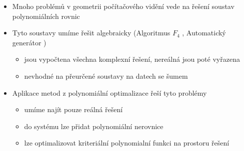 \documentclass[cmpiitalkstyle, 22pt]{cmptalk}
\begin{document}
\begin{cmptalkslide}[Motivace]
  \begin{itemize}
    \item Mnoho problémů v geometrii počítačového vidění vede na řešení soustav polynomiálních rovnic
    \item Tyto soustavy umíme řešit algebraicky (Algoritmus $F_4$ \cite{F4}, Automatický generátor \cite{AutoGen})
    \begin{itemize}
      \item jsou vypočtena všechna komplexní řešení, nereálná jsou poté vyřazena
      \item nevhodné na přeurčené soustavy na datech se šumem
    \end{itemize}
    \item Aplikace metod z polynomiální optimalizace řeší tyto problémy
    \begin{itemize}
      \item umíme najít pouze reálná řešení
      \item do systému lze přidat polynomiální nerovnice
      \item lze optimalizovat kriteriální polynomialní funkci na prostoru řešení
    \end{itemize}
  \end{itemize}


\end{cmptalkslide}
\end{document}
